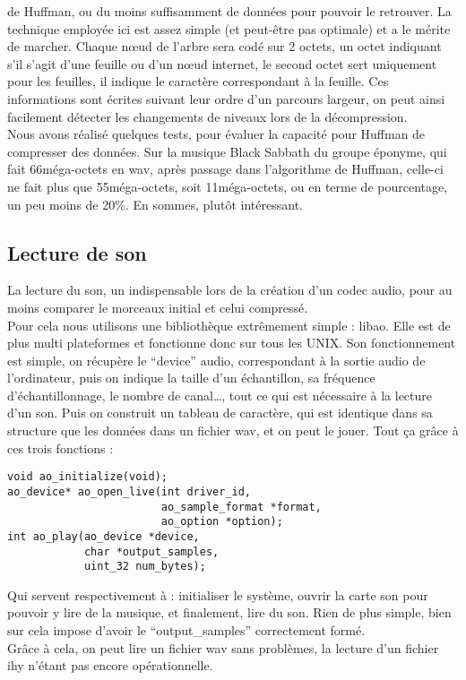 \documentclass[a4paper,12pt]{article}
\begin{document}
de Huffman, ou du moins suffisamment de données pour pouvoir le
retrouver. La technique employée ici est assez simple (et peut-être pas
optimale) et a le mérite de marcher. Chaque nœud de l'arbre sera codé
sur 2 octets, un octet indiquant s'il s'agit d'une feuille ou d'un nœud
internet, le second octet sert uniquement pour les feuilles, il indique
le caractère correspondant à la feuille. Ces informations sont écrites
suivant leur ordre d'un parcours largeur, on peut ainsi facilement
détecter les changements de niveaux lors de la décompression.\\
Nous avons réalisé quelques tests, pour évaluer la capacité pour Huffman
de compresser des données. Sur la musique Black Sabbath du groupe
éponyme, qui fait 66méga-octets en wav, après passage dans l'algorithme
de Huffman, celle-ci ne fait plus que 55méga-octets, soit 11méga-octets,
ou en terme de pourcentage, un peu moins de 20\%. En sommes, plutôt
intéressant.\\

	\subsection{Lecture de son}
La lecture du son, un indispensable lors de la création d'un codec
audio, pour au moins comparer le morceaux initial et celui compressé.\\
Pour cela nous utilisons une bibliothèque extrêmement simple : libao.
Elle est de plus multi plateformes et fonctionne donc sur tous les UNIX.
Son fonctionnement est simple, on récupère le ``device'' audio,
correspondant à la sortie audio de l'ordinateur, puis on indique la
taille d'un échantillon, sa fréquence d'échantillonnage, le nombre de
canal\ldots, tout ce qui est nécessaire à la lecture d'un son. Puis on
construit un tableau de caractère, qui est identique dans sa structure
que les données dans un fichier wav, et on peut le jouer. Tout ça grâce
à ces trois fonctions :
\newpage
\begin{verbatim}
void ao_initialize(void);
ao_device* ao_open_live(int driver_id,
                        ao_sample_format *format,
                        ao_option *option);
int ao_play(ao_device *device,
            char *output_samples,
            uint_32 num_bytes);
\end{verbatim}
Qui servent respectivement à : initialiser le système, ouvrir la carte
son pour pouvoir y lire de la musique, et finalement, lire du son. Rien
de plus simple, bien sur cela impose d'avoir le ``output\_samples''
correctement formé.\\
Grâce à cela, on peut lire un fichier wav sans problèmes, la lecture
d'un fichier ihy n'étant pas encore opérationnelle.\\
\end{document}
